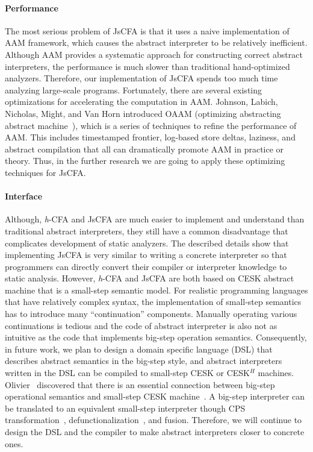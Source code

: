 \documentclass[12pt]{report}
\begin{document}
\paragraph{Performance}
The most serious problem of JsCFA is that it uses a naive implementation of AAM framework, which causes the abstract interpreter to be relatively inefficient.
Although AAM provides a systematic approach for constructing correct abstract interpreters, the performance is much slower than traditional hand-optimized analyzers.
Therefore, our implementation of JsCFA spends too much time analyzing large-scale programs.
Fortunately, there are several existing optimizations for accelerating the computation in AAM\@.
Johnson, Labich, Nicholas, Might, and Van Horn introduced OAAM (optimizing abstracting abstract machine~\cite{johnson2013optimizing}), which is a series of techniques to refine the performance of AAM\@.
This includes timestamped frontier, log-based store deltas, laziness, and abstract compilation that all can dramatically promote AAM in practice or theory.
Thus, in the further research we are going to apply these optimizing techniques for JsCFA\@.

\paragraph{Interface}
Although, \textit{h}-CFA and JsCFA are much easier to implement and understand than traditional abstract interpreters, they still have a common disadvantage that complicates development of static analyzers.
The described details show that implementing JsCFA is very similar to writing a concrete interpreter so that programmers can directly convert their compiler or interpreter knowledge to static analysis.
However, \textit{h}-CFA and JsCFA are both based on CESK abstract machine that is a small-step semantic model.
For realistic programming languages that have relatively complex syntax, the implementation of small-step semantics has to introduce many ``continuation'' components.
Manually operating various continuations is tedious and the code of
abstract interpreter is also not as intuitive as the code that implements big-step operation semantics.
Consequently, in future work, we plan to design a domain specific language (DSL) that describes abstract semantics in the big-step style, and abstract interpreters written in the DSL can be compiled to small-step CESK or CESK$^H$ machines.
Olivier~\cite{danvy2008defunctionalized} discovered that there is an essential connection between big-step
operational semantics and small-step CESK machine~\cite{felleisen2009semantics}.
A big-step interpreter can be translated to an equivalent small-step interpreter though CPS transformation~\cite{danvy1992representing}, defunctionalization~\cite{danvy2001defunctionalization}, and fusion.
Therefore, we will continue to design the DSL and the compiler to make abstract interpreters closer to concrete ones.
\end{document}
